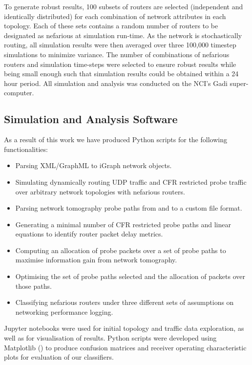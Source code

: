 To generate robust results, 100 subsets of routers are selected (independent
and identically distributed) for each combination of network attributes in each topology. Each of these sets contains a random number of routers to be designated as nefarious at simulation run-time. As the network is stochastically routing, all simulation results were then averaged over three 100,000 timestep simulations to minimize variance. The number of combinations of nefarious routers and simulation time-steps were selected to ensure robust results while being small enough such that simulation results could be obtained within a 24 hour period. All simulation and analysis was conducted on the NCI's Gadi super-computer.\par

\subsection{Simulation and Analysis Software}
\label{ssec:Msoftware}
As a result of this work we have produced Python scripts for the following functionalities:
\begin{itemize}
    \item Parsing XML/GraphML to iGraph network objects.
    \item Simulating dynamically routing UDP traffic and CFR restricted probe traffic over arbitrary network topologies with nefarious routers.
    \item Parsing network tomography probe paths from and to a custom file format.
    \item Generating a minimal number of CFR restricted probe paths and linear equations to identify router packet delay metrics.
    \item Computing an allocation of probe packets over a set of probe paths to maximise information gain from network tomography.
    \item Optimising the set of probe paths selected and the allocation of packets over those paths.
    \item Classifying nefarious routers under three different sets of assumptions on networking performance logging.
\end{itemize}
Jupyter notebooks were used for initial topology and traffic data exploration, as well as for visualisation of results. Python scripts were developed using Matplotlib (\cite{hunter_matplotlib_2007}) to produce confusion matrices and receiver operating characteristic plots for evaluation of our classifiers.

